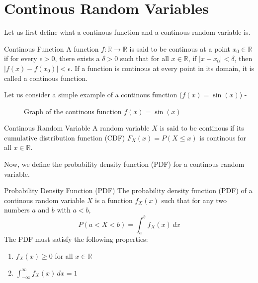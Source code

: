 \documentclass[openany]{book}
\begin{document}
\section{Continous Random Variables}
Let us first define what a continous function and a continous random variable is.
\begin{mydefinition}{Continous Function}
    A function \( f: \mathbb{R} \to \mathbb{R} \) is said to be continous at a point \( x_0 \in \mathbb{R} \) if for every \( \epsilon > 0 \), there exists a \( \delta > 0 \) such that for all \( x \in \mathbb{R} \), if \( |x - x_0| < \delta \), then \( |f(x) - f(x_0)| < \epsilon \). If a function is continous at every point in its domain, it is called a continous function.
\end{mydefinition}
Let us consider a simple example of a continous function ($f(x) = \sin (x)$) - 
\begin{figure}[H]
    \centering
    \caption{Graph of the continous function \( f(x) = \sin(x) \)}
\end{figure}
\begin{mydefinition}{Continous Random Variable}
    A random variable \( X \) is said to be continous if its cumulative distribution function (CDF) \( F_X(x) = P(X \leq x) \) is continous for all \( x \in \mathbb{R} \).
\end{mydefinition}
Now, we define the probability density function (PDF) for a continous random variable.
\begin{mydefinition}{Probability Density Function (PDF)}
    The probability density function (PDF) of a continous random variable \( X \) is a function \( f_X(x) \) such that for any two numbers \( a \) and \( b \) with \( a < b \),
    \[
        P(a < X < b) = \int_{a}^{b} f_X(x) \, dx
    \]
    The PDF must satisfy the following properties:
    \begin{enumerate}
        \item \( f_X(x) \geq 0 \) for all \( x \in \mathbb{R} \)
        \item \( \int_{-\infty}^{\infty} f_X(x) \, dx = 1 \)
    \end{enumerate}
\end{mydefinition}
\end{document}

